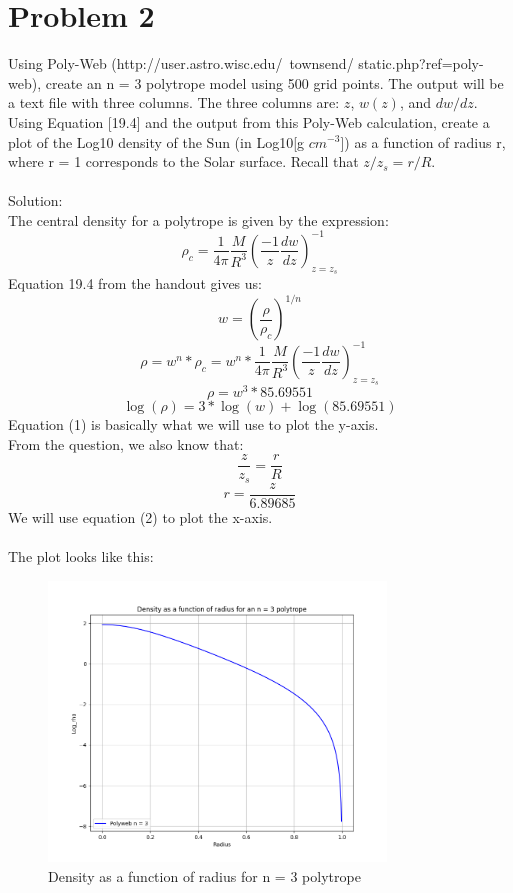 \documentclass[10pt]{article}
\begin{document}
\section*{Problem 2}
Using Poly-Web (http://user.astro.wisc.edu/~townsend/ static.php?ref=poly-web), create an n = 3 polytrope model using 500 grid points. The output will be a text file with three columns. The three columns are: $z$, $w(z)$, and $dw/dz$. Using Equation [19.4] and the output from this Poly-Web calculation, create a plot of the Log10 density of the Sun (in Log10[g $cm^{-3}$]) as a function of radius r, where r = 1 corresponds to the Solar surface. Recall that $z/z_{s} = r/R$. \\ \\
Solution:\\
The central density for a polytrope is given by the expression:
\[ \rho_{c} = \frac{1}{4 \pi} \frac{M}{R^3} \left( \frac{-1}{z} \frac{dw}{dz}\right)^{-1}_{z = z_{s}}\]
Equation 19.4 from the handout gives us:
\[ w = \left( \frac{\rho}{\rho_{c}}\right)^{1/n}\]
\[ \rho = w^{n} * \rho_{c} = w^{n} * \frac{1}{4 \pi} \frac{M}{R^3} \left( \frac{-1}{z} \frac{dw}{dz}\right)^{-1}_{z = z_{s}} \]
\[ \rho = w^{3} * 85.69551\]
\begin{equation}
    \log{(\rho)} = 3 * \log{(w)} + \log{(85.69551)}  \tag{1}
\end{equation}
Equation (1) is basically what we will use to plot the y-axis.\\
From the question, we also know that:
\[ \frac{z}{z_{s}} = \frac{r}{R}\]
\begin{equation}
    r = \frac{z}{6.89685} \tag{2}
\end{equation}
We will use equation (2) to plot the x-axis.\\ \\
The plot looks like this:
\begin{figure}[h]
    \centering
    \includegraphics[width=0.8\textwidth]{hw_8_astron_310_q2.png}
    \caption{Density as a function of radius for n = 3 polytrope}
    \label{fig:enter-label}
\end{figure}
\end{document}
